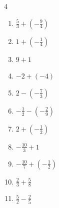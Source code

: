 \begin{multicols}{4}
\begin{enumerate}

  \item $\displaystyle \frac{5}{3} + \left(-\frac{9}{4}\right)$


\columnbreak %

  \item $\displaystyle 1 + \left(-\frac{1}{4}\right)$


  \item $\displaystyle 9 + 1$

        \phantom{$\displaystyle =10$}

  \item $\displaystyle -2 + \left(-4\right)$

        \phantom{$\displaystyle =-6$}

  \item $\displaystyle 2 - \left(-\frac{7}{3}\right)$


  \item $\displaystyle -\frac{1}{2} - \left(-\frac{2}{9}\right)$


  \item $\displaystyle 2 + \left(-\frac{1}{2}\right)$


  \item $\displaystyle -\frac{10}{3} + 1$


  \item $\displaystyle -\frac{10}{7} + \left(-\frac{1}{2}\right)$


  \item $\displaystyle \frac{2}{3} + \frac{5}{8}$


  \item $\displaystyle \frac{5}{2} - \frac{2}{5}$


\columnbreak %


\end{enumerate}
\end{multicols}
